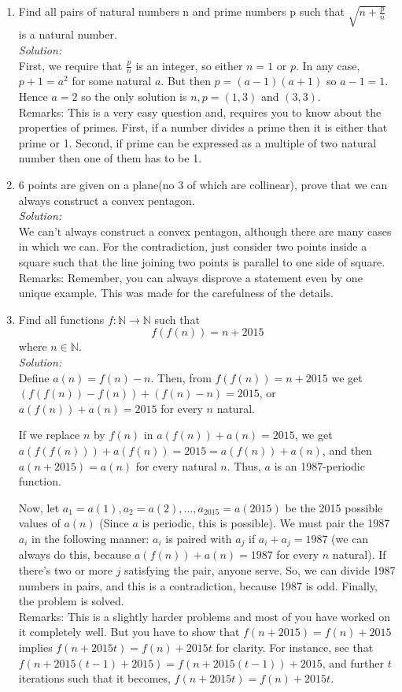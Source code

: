 \documentclass{article}
\begin{document}
\begin{enumerate}
\item Find all pairs of natural numbers n and prime numbers p such that $\sqrt{n+\frac{p}{n}}$ is a natural number.\\
\textit{Solution:}\\
First, we require that $ \frac{p}{n} $ is an integer, so either $ n=1$ or $p$. In any case, $ p + 1 = a^2 $ for some natural $a$. But then $ p = (a-1)(a+1)$ so $ a - 1 = 1 $. Hence $ a = 2 $ so the only solution is $ n,p = (1,3)$ and $(3,3)$.\\
Remarks: This is a very easy question and, requires you to know about the properties of primes.
First, if a number divides a prime then it is either that prime or 1. Second, if prime can be expressed as a multiple of two natural number then one of them has to be 1.


\item 6 points are given on a plane(no 3 of which are collinear), prove that we can always construct a convex pentagon.\\
\textit{Solution:}\\
We can't always construct a convex pentagon, although there are many cases in which we can. For the contradiction, just consider two points inside a square such that the line joining two points is parallel to one side of square.\\
Remarks: Remember, you can always disprove a statement even by one unique example. This was made for the carefulness of the details.

\item Find all functions $f:\mathbb{N}\to\mathbb{N}$ such that \[f(f(n))=n+2015\]where $n\in \mathbb{N}.$\\
\textit{Solution:}\\
Define $a(n)=f(n)-n$. Then, from $f(f(n))=n+2015$ we get $(f(f(n))-f(n))+(f(n)-n)=2015$, or $a(f(n))+a(n)=2015$ for every $n$ natural.

If we replace $n$ by $f(n)$ in $a(f(n))+a(n)=2015$, we get $a(f(f(n)))+a(f(n))=2015=a(f(n))+a(n)$, and then $a(n+2015)=a(n)$ for every natural $n$. Thus, $a$ is an 1987-periodic function.

Now, let $a_1=a(1), a_2=a(2),...,a_{2015}=a(2015)$ be the 2015 possible values of $a(n)$ (Since $a$ is periodic, this is possible). We must pair the 1987 $a_i$ in the following manner: $a_i$ is paired with $a_j$ if $a_i +a_j =1987$ (we can always do this, because $a(f(n))+a(n)=1987$ for every $n$ natural). If there's two or more $j$ satisfying the pair, anyone serve. So, we can divide 1987 numbers in pairs, and this is a contradiction, because 1987 is odd. Finally, the problem is solved.\\
Remarks: This is a slightly harder problems and most of you have worked on it completely well.
But you have to show that $f(n+2015)=f(n)+2015$ implies $f(n+2015t)=f(n)+2015t$ for clarity. For instance, see that $f(n+2015(t-1)+2015)= f(n+2015(t-1))+2015$, and further $t$ iterations such that it becomes, $f(n+2015t)=f(n)+2015t$. 



\end{enumerate}
\end{document}
